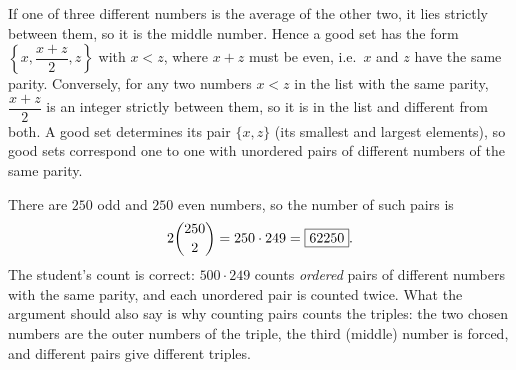 If one of three different numbers is the average of the other two, it lies strictly between them, so it is the middle number. Hence a good set has the form $\left\{x,\dfrac{x+z}{2},z\right\}$ with $x<z$, where $x+z$ must be even, i.e.\ $x$ and $z$ have the same parity. Conversely, for any two numbers $x<z$ in the list with the same parity, $\dfrac{x+z}{2}$ is an integer strictly between them, so it is in the list and different from both. A good set determines its pair $\{x,z\}$ (its smallest and largest elements), so good sets correspond one to one with unordered pairs of different numbers of the same parity.

There are $250$ odd and $250$ even numbers, so the number of such pairs is
\[
2\dbinom{250}{2}=250\cdot249=\boxed{62250}.
\]
The student's count is correct: $500\cdot249$ counts \emph{ordered} pairs of different numbers with the same parity, and each unordered pair is counted twice. What the argument should also say is why counting pairs counts the triples: the two chosen numbers are the outer numbers of the triple, the third (middle) number is forced, and different pairs give different triples.
